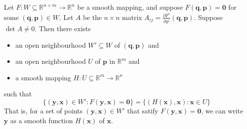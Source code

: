\documentclass[notoc,notitlepage]{tufte-book}
\begin{document}
\begin{thm}\label{thm:implicit_function_theorem}
  Let $F : W \subseteq \mathbb{R}^{n + m} \to \mathbb{R}^n$ be a smooth mapping,
  and suppose $F(\bm{q}, \bm{p}) = \bm{0}$ for some $(\bm{q}, \bm{p}) \in W$.
  Let $A$ be the $n \times n$ matrix $A_{ij} = \frac{\partial F^i}{\partial y^j}
  (\bm{q}, \bm{p})$. Suppose $\det A \neq 0$. Then there exists
  \begin{itemize}
    \item an open neighbourhood $W' \subseteq W$ of $(\bm{q}, \bm{p})$ and
    \item an open neighbourhood $U$ of $\bm{p}$ in $\mathbb{R}^m$ and
    \item a smooth mapping $H : U \subseteq \mathbb{R}^m \to \mathbb{R}^n$
  \end{itemize}
  such that
  \begin{equation*}
    \{ (\bm{y}, \bm{x}) \in W' : F(\bm{y}, \bm{x}) = \bm{0} \} = \{ (H(\bm{x}),
    \bm{x}) : \bm{x} \in U \}
  \end{equation*}
  That is, for a set of points $(\bm{y}, \bm{x}) \in W'$ that satify $F(\bm{y},
  \bm{x}) = \bm{0}$, we can write $\bm{y}$ as a smooth function $H(\bm{x})$ of
  $\bm{x}$.
\end{thm}



\backmatter

\makeatletter
\fancyhead[LE]{\thepage \enspace \textsl{\leftmark}}
\makeatother



\printindex
\end{document}
